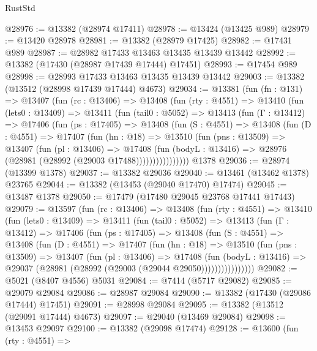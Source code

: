 \begin{lexlean}{RustStd}
\begin{coremodule}
@28976 := @13382 (@28974 @17411)
@28978 := @13424 (@13425 @989)
@28979 := @13420 @28978
@28981 := @13382 (@28979 @17425)
@28982 := @17431 @989
@28987 := @28982 @17433 @13463 @13435 @13439 @13442
@28992 := @13382 (@17430 (@28987 @17439 @17444) @17451)
@28993 := @17454 @989
@28998 := @28993 @17433 @13463 @13435 @13439 @13442
@29003 := @13382 (@13512 (@28998 @17439 @17444) @4673)
@29034 := @13381
    (fun (fn : @131) =>
    @13407
      (fun (rc : @13406) =>
      @13408
        (fun (rty : @4551) =>
        @13410
          (fun (lets0 : @13409) =>
          @13411
            (fun (tail0 : @5052) =>
            @13413
              (fun (Γ : @13412) =>
              @17406
                (fun (ps : @17405) =>
                @13408
                  (fun (S : @4551) =>
                  @13408
                    (fun (D : @4551) =>
                    @17407
                      (fun (hn : @18) =>
                      @13510
                        (fun (pns : @13509) =>
                        @13407
                          (fun (pl : @13406) =>
                          @17408
                            (fun (bodyL : @13416) =>
                            @28976 (@28981 (@28992 (@29003 @17488))))))))))))))))
    @1378
@29036 := @28974 (@13399 @1378)
@29037 := @13382 @29036
@29040 := @13461 (@13462 @1378) @23765
@29044 := @13382 (@13453 (@29040 @17470) @17474)
@29045 := @13487 @1378
@29050 := @17479 (@17480 @29045 @23768 @17441 @17443)
@29079 := @13597
    (fun (rc : @13406) =>
    @13408
      (fun (rty : @4551) =>
      @13410
        (fun (lets0 : @13409) =>
        @13411
          (fun (tail0 : @5052) =>
          @13413
            (fun (Γ : @13412) =>
            @17406
              (fun (ps : @17405) =>
              @13408
                (fun (S : @4551) =>
                @13408
                  (fun (D : @4551) =>
                  @17407
                    (fun (hn : @18) =>
                    @13510
                      (fun (pns : @13509) =>
                      @13407
                        (fun (pl : @13406) =>
                        @17408
                          (fun (bodyL : @13416) =>
                          @29037 (@28981 (@28992 (@29003 (@29044 @29050))))))))))))))))
@29082 := @5021 (@8407 @4556) @5031
@29084 := @7414 (@5717 @29082)
@29085 := @29079 @29084
@29086 := @28987 @29084
@29090 := @13382 (@17430 (@29086 @17444) @17451)
@29091 := @28998 @29084
@29095 := @13382 (@13512 (@29091 @17444) @4673)
@29097 := @29040 (@13469 @29084)
@29098 := @13453 @29097
@29100 := @13382 (@29098 @17474)
@29128 := @13600
    (fun (rty : @4551) =>

\end{coremodule}
\end{lexlean}
